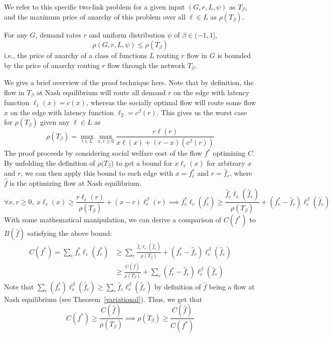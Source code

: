 We refer to this specific two-link problem for a given input $(G,r,L,\psi)$ as $T_\beta$, and the maximum price of anarchy of this problem over all $\ell \in L$ as $\rho(T_\beta)$.
\begin{theorem}
For any $G$, demand rates $r$ and uniform distribution $\psi$ of $\beta \in (-1, 1]$,
    $$\rho(G,r,{L},\psi) \le \rho(T_\beta)$$
   i.e., the price of anarchy of a class of functions $L$ routing $r$ flow in $G$ is 
    bounded by the price of anarchy routing $r$ flow through the network $T_\beta$.
    \end{theorem}
\begin{proof-sketch}
    We give a brief overview of the proof technique here.
    Note that by definition, 
    the flow in $T_\beta$ at Nash equilibrium will route all demand $r$ on the edge with latency function $\ell_1(x) = c(x)$, whereas the socially optimal flow will route some flow $x$ on the edge with latency function $\ell_2 = c^\beta(r)$. This gives us the worst case for $\rho(T_\beta)$ given any $\ell \in L$ as
    $$\rho(T_\beta) = \max_{l\in{L}} \max_{x,r\ge 0} \frac{r\ell(r)}{x\ell(x) + (r-x)(c^\beta(r))}$$
    The proof proceeds by considering social welfare cost of the flow $f^*$ optimizing $C$. By unfolding the definition of $\rho(T_\beta$) to get a bound for $x\ell_e(x)$ for arbitrary $x$ and $r$, we can then apply this bound to each edge with $x = f^*_e$ and $r = \hat{f}_e$, where $\hat{f}$ is the optimizing flow at Nash equilibrium. 
    $$\forall x,r\ge 0,~ x\ell_e(x) \ge \frac{r\ell_e(r)}{\rho(T_\beta)}  + (x-r)\ell^\beta_e(r)
    \implies  f^*_e\ell_e(f^*_e) \ge \frac{\hat{f}_e\ell_e(\hat{f}_e)}{\rho(T_\beta)}  + (f^*_e-\hat{f}_e)\ell^\beta_e(\hat{f}_e)$$
    With some mathematical manipulation, we can derive a comparison of $C(f^*)$ to $B(\hat{f})$ satisfying the above bound:
    \begin{align*}
        C(f^*) = \sum_e f^*_e\ell_e(f^*_e) &\ge \sum_e \frac{\hat{f}_e\ell_e(\hat{f}_e)}{\rho(T_\beta)} + (f^*_e-\hat{f}_e)\ell^\beta_e(\hat{f}_e)\\
        &\ge \frac{C(\hat{f})}{\rho(T_\beta)} + \sum_e (f^*_e-\hat{f}_e)\ell^\beta_e(\hat{f}_e)
    \end{align*}
    Note that $\sum_e (f^*_e) \ell^\beta_e(\hat{f}_e) \ge \sum_e \hat{f}_e\ell^\beta_e(\hat{f}_e)$ by definition of $\hat{f}$ being a flow at Nash equilibrium (see Theorem~\ref{variational}).
    Thus, we get that 
        $$C(f^*) \ge \frac{C(\hat{f})}{\rho(T_\beta)}\implies \rho(T_\beta) \ge \frac{C(\hat{f})}{C(f^*)}$$
\end{proof-sketch}

